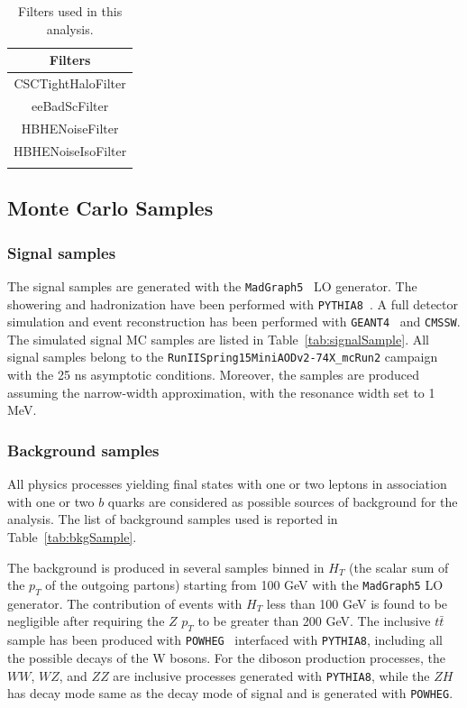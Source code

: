 \begin{table}[t]
  \caption{Filters used in this analysis.}
  \label{tab:filter}
  \centering
  \begin{tabular}{c}
    \toprule
    Filters            \\
    \midrule
    CSCTightHaloFilter \\
    eeBadScFilter      \\
    HBHENoiseFilter    \\
    HBHENoiseIsoFilter \\
    \bottomrule        \\
  \end{tabular}
\end{table}

\subsection{Monte Carlo Samples}

\subsubsection*{Signal samples}

The signal samples are generated with the \texttt{MadGraph5}~\cite{Alwall:2011uj} LO generator. The showering and hadronization have been performed with \texttt{PYTHIA8}~\cite{Sjostrand:2007gs}. A full detector simulation and event reconstruction has been performed with \texttt{GEANT4}~\cite{Agostinelli:2002hh} and \texttt{CMSSW}. The simulated signal MC samples are listed in Table~\ref{tab:signalSample}. All signal samples belong to the \texttt{RunIISpring15MiniAODv2-74X\_mcRun2} campaign with the 25 ns asymptotic conditions. Moreover, the samples are produced assuming the narrow-width approximation, with the resonance width set to 1 MeV.

\subsubsection*{Background samples}

All physics processes yielding final states with one or two leptons in association with one or two $b$ quarks are considered as possible sources of background for the analysis. The list of background samples used is reported in Table~\ref{tab:bkgSample}.

The \Zjets background is produced in several samples binned in $H_T$ (the scalar sum of the $p_T$ of the outgoing partons) starting from 100 GeV with the \texttt{MadGraph5} LO generator. The contribution of events with $H_T$ less than 100 GeV is found to be negligible after requiring the $Z$ $p_T$ to be greater than 200 GeV. The inclusive $t\bar{t}$ sample has been produced with \texttt{POWHEG}~\cite{Oleari:2010nx} interfaced with \texttt{PYTHIA8}, including all the possible decays of the W bosons. For the diboson production processes, the $WW$, $WZ$, and $ZZ$ are inclusive processes generated with \texttt{PYTHIA8}, while the $ZH$ has decay mode same as the decay mode of signal and is generated with \texttt{POWHEG}.

